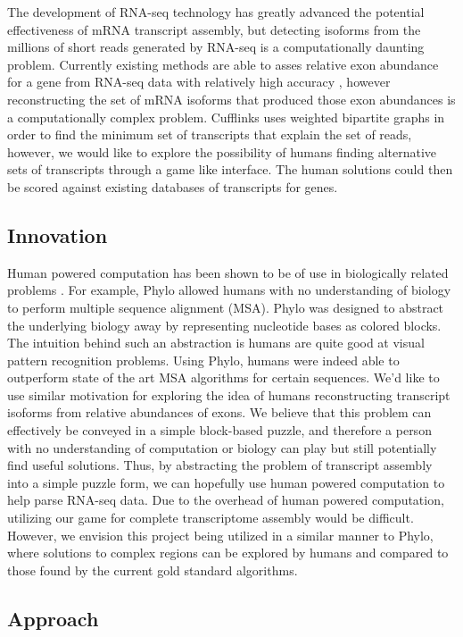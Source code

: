 \documentclass[12pt]{article}
\begin{document}
The development of RNA-seq technology has greatly advanced the potential effectiveness of mRNA transcript assembly, but detecting isoforms from the millions of short reads generated by RNA-seq is a computationally daunting problem. Currently existing methods are able to asses relative exon abundance for a gene from RNA-seq data with relatively high accuracy \citep{trapnell2009tophat}, however reconstructing the set of mRNA isoforms that produced those exon abundances is a computationally complex problem. Cufflinks uses weighted bipartite graphs in order to find the minimum set of transcripts that explain the set of reads, however, we would like to explore the possibility of humans finding alternative sets of transcripts through a game like interface. The human solutions could then be scored against existing databases of transcripts for genes.

\subsection*{Innovation}
Human powered computation has been shown to be of use in biologically related problems \citep{kawrykow2012phylo, cooper2010predicting}. For example, Phylo allowed humans with no understanding of biology to perform multiple sequence alignment (MSA). Phylo was designed to abstract the underlying biology away by representing nucleotide bases as colored blocks.  The intuition behind such an abstraction is humans are quite good at visual pattern recognition problems. Using Phylo, humans were indeed able to outperform state of the art MSA algorithms for certain sequences. We'd like to use similar motivation for exploring the idea of humans reconstructing transcript isoforms from relative abundances  of exons. We believe that this problem can effectively be conveyed in a simple block-based puzzle, and therefore a person with no understanding of computation or biology can play but still potentially find useful solutions. Thus, by abstracting the problem of transcript assembly into a simple puzzle form, we can hopefully use human powered computation to help parse RNA-seq data. Due to the overhead of human powered computation, utilizing our game for complete transcriptome assembly would be difficult. However, we envision
this project being utilized in a similar manner to Phylo, where solutions to complex regions can be explored by humans and compared to those found by the current gold standard algorithms.

\subsection*{Approach}
\end{document}
